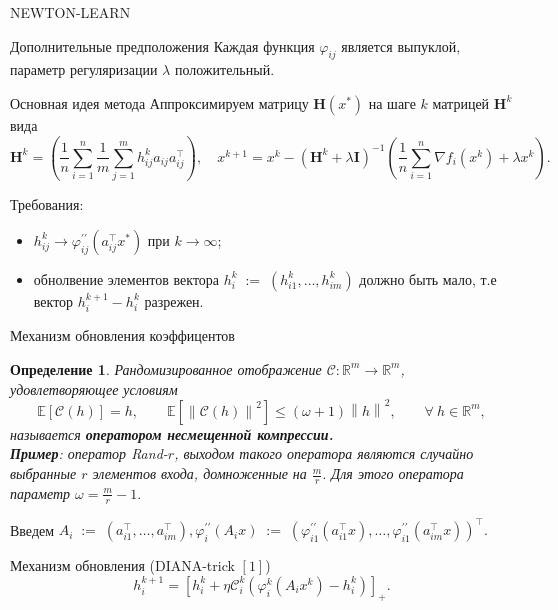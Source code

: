 \documentclass[aspectratio=169,xcolor=dvipsnames]{beamer}
\newcommand{\eqdef}{\; { := }\;}
\newcommand{\R}{\mathbb{R}}
\newcommand{\ExpBr}[1]{\mathbb{E}\left[#1\right]}
\newcommand{\norm}[1]{\left\|#1\right\|}
\newcommand{\mH}{\mathbf{H}}
\newcommand{\mI}{\mathbf{I}}
\newcommand{\cC}{{\mathcal{C}}}
\newtheorem{def1}{Определение}
\begin{document}
\begin{frame}{NEWTON-LEARN}
    \begin{block}{Дополнительные предположения}
        Каждая функция $\varphi_{ij}$ является выпуклой, параметр регуляризации $\lambda$ положительный. 
    \end{block}
    \begin{alertblock}{Основная идея метода}
    Аппроксимируем матрицу $\mH(x^*)$ на шаге $k$ матрицей $\mH^k$ вида
        \begin{equation}
            \mH^k = \left(\frac{1}{n}\sum\limits_{i=1}^n\frac{1}{m}\sum\limits_{j=1}^mh_{ij}^k a_{ij}a_{ij}^\top\right), \quad x^{k+1} = x^k - \left(\mH^k+\lambda\mI\right)^{-1}\left(\frac{1}{n}\sum\limits_{i=1}^n\nabla f_i(x^k) + \lambda x^k\right).
        \end{equation}
    \end{alertblock}
    Требования:
    \begin{itemize}
        \item $h_{ij}^k \to \varphi_{ij}^{\prime\prime}(a_{ij}^\top x^*) \text{ при } k \to \infty$;
        \item обнолвение элементов вектора $h_i^k \eqdef (h_{i1}^k, \dots, h_{im}^k)$ должно быть мало, т.е вектор $h_i^{k+1} - h_i^k$ разрежен.
    \end{itemize}
\end{frame}


\begin{frame}{Механизм обновления коэффицентов}
    
    \begin{def1}
        Рандомизированное отображение $\cC:\R^m \to \R^m$, удовлетворяющее условиям
        \begin{equation}
            \ExpBr{\cC(h)} = h, \qquad \ExpBr{\norm{\cC(h)}^2} \leq (\omega+1)\norm{h}^2, \qquad \forall~h \in \R^m,
        \end{equation}
        называется {\bf оператором несмещенной компрессии.}\\
        {\bf Пример}: оператор Rand-$r$, выходом такого оператора являются случайно выбранные $r$ элементов входа, домноженные на $\frac{m}{r}.$ Для этого оператора параметр $\omega=\frac{m}{r}-1.$
    \end{def1}
    
    Введем $A_i \eqdef (a_{i1}^\top, \dots, a_{im}^\top), \varphi^{\prime\prime}_i(A_ix) \eqdef (\varphi_{i1}^{\prime\prime}(a_{i1}^\top x), \dots, \varphi_{i1}^{\prime\prime}(a_{im}^\top x))^\top.$
    \begin{block}{Механизм обновления (DIANA-trick $[1]$)}
    \begin{equation}
        h_i^{k+1} = \left[h_i^k + \eta \cC^k_i(\varphi_{i}^k(A_ix^k)-h_i^k)\right]_+.
    \end{equation}
    \end{block}
\end{frame}
\end{document}
